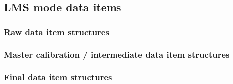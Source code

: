 \subsection{LMS mode data items}\label{ssec:lms_drl_items_structures}
\subsubsection{Raw data item structures}\label{sssec:lmsrawdatastructs}
\subsubsection{Master calibration / intermediate data item structures}\label{sssec:lmsprocdatastructs}
\subsubsection{Final data item structures}\label{sssec:lmsfinaldatastructs}